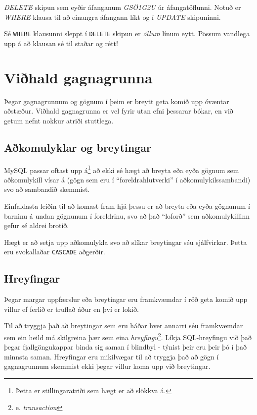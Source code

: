 \begin{example}
\caption[DELETE]{\emph{DELETE} skipun sem eyðir áfanganum \emph{GSÖ1G2U} úr áfangatöflunni. Notuð er \emph{WHERE} klausa til að einangra áfangann líkt og í \emph{UPDATE} skipuninni.}
\label{sql:k7d4-delete}
\centering
{}
\end{example}

Sé \verb|WHERE| klausunni sleppt í \verb|DELETE| skipun er \emph{öllum} línum eytt. Pössum vandlega upp á að klausan sé til staðar og rétt!
\section{Viðhald gagnagrunna}
Þegar gagnagrunnum og gögnum í þeim er breytt geta komið upp óvæntar aðstæður. Viðhald gagnagrunna er vel fyrir utan efni þessarar bókar, en við getum nefnt nokkur atriði stuttlega.
\subsection{Aðkomulyklar og breytingar}
MySQL passar oftast upp á\footnote{Þetta er stillingaratriði sem hægt er að slökkva á.} að ekki sé hægt að breyta eða eyða gögnum sem aðkomulykill vísar á (gögn sem eru í ``foreldrahlutverki'' í aðkomulykilssambandi) svo að sambandið skemmist.

Einfaldasta leiðin til að komast fram hjá þessu er að breyta eða eyða gögnunum í barninu á undan gögnunum í foreldrinu, svo að það ``loforð'' sem aðkomulykillinn gefur sé aldrei brotið.

Hægt er að setja upp aðkomulykla svo að slíkar breytingar séu sjálfvirkar. Þetta eru svokallaðar \verb|CASCADE| aðgerðir.
\subsection{Hreyfingar} %
Þegar margar uppfærslur eða breytingar eru framkvæmdar í röð geta komið upp villur ef ferlið er truflað áður en því er lokið.

Til að tryggja það að breytingar sem eru háðar hver annarri séu framkvæmdar sem ein heild má skilgreina þær sem eina \emph{hreyfingu}\footnote{e. \emph{transaction}}. Líkja SQL-hreyfingu við það þegar fjallgöngukappar binda sig saman í blindbyl - týnist þeir eru þeir þó í það minnsta saman. Hreyfingar eru mikilvægar til að tryggja það að gögn í gagnagrunnum skemmist ekki þegar villur koma upp við breytingar.

